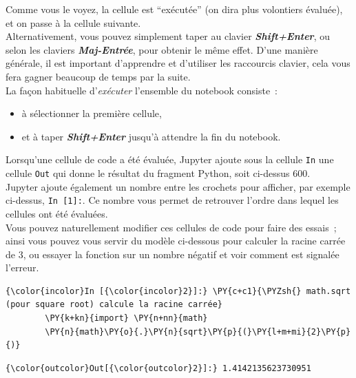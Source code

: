     Comme vous le voyez, la cellule est ``exécutée'' (on dira plus
volontiers évaluée), et on passe à la cellule suivante.\\

Alternativement, vous pouvez simplement taper au clavier
\textbf{\emph{Shift+Enter}}, ou selon les claviers
\textbf{\emph{Maj-Entrée}}, pour obtenir le même effet. D'une manière
générale, il est important d'apprendre et d'utiliser les raccourcis
clavier, cela vous fera gagner beaucoup de temps par la suite.\\

    La façon habituelle d'\emph{exécuter} l'ensemble du notebook consiste~:
    
\begin{itemize}
	\item 
	à sélectionner la première cellule,
	\item
	et à taper \textbf{\emph{Shift+Enter}} jusqu'à attendre la fin du notebook.
\end{itemize}

    Lorsqu'une cellule de code a été évaluée, Jupyter ajoute sous la cellule
\texttt{In} une cellule \texttt{Out} qui donne le résultat du fragment
Python, soit ci-dessus 600.\\

Jupyter ajoute également un nombre entre les crochets pour afficher, par
exemple ci-dessus, \texttt{In\ {[}1{]}:}. Ce nombre vous permet de
retrouver l'ordre dans lequel les cellules ont été évaluées.\\

    Vous pouvez naturellement modifier ces cellules de code pour faire des
essais~; ainsi vous pouvez vous servir du modèle ci-dessous pour
calculer la racine carrée de 3, ou essayer la fonction sur un nombre
négatif et voir comment est signalée l'erreur.

    \begin{Verbatim}[commandchars=\\\{\}]
{\color{incolor}In [{\color{incolor}2}]:} \PY{c+c1}{\PYZsh{} math.sqrt (pour square root) calcule la racine carrée}
        \PY{k+kn}{import} \PY{n+nn}{math}
        \PY{n}{math}\PY{o}{.}\PY{n}{sqrt}\PY{p}{(}\PY{l+m+mi}{2}\PY{p}{)}
\end{Verbatim}


\begin{Verbatim}[commandchars=\\\{\}]
{\color{outcolor}Out[{\color{outcolor}2}]:} 1.4142135623730951
\end{Verbatim}
            
